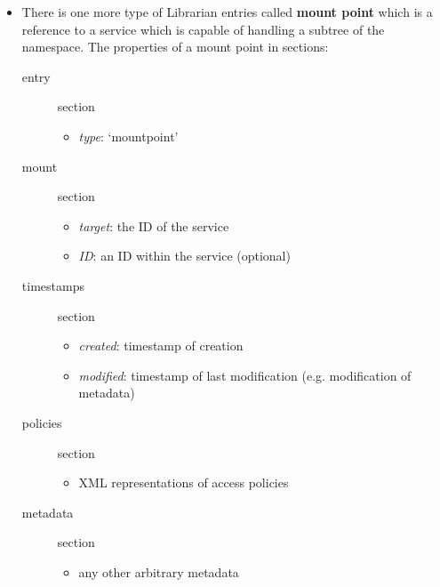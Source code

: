 \documentclass{book}
\begin{document}
\begin{itemize}
    \item There is one more type of Librarian entries called \textbf{mount point} which is a reference to a service which is capable of handling a subtree of the namespace. The properties of a mount point in sections:
    \begin{description}
        \item [entry] section 
        \begin{itemize}
            \item \emph{type}: `mountpoint' 
        \end{itemize}
        \item [mount] section 
        \begin{itemize}
            \item \emph{target}: the ID of the service
            \item \emph{ID}: an ID within the service (optional)
        \end{itemize}
        \item [timestamps] section 
        \begin{itemize}
            \item \emph{created}: timestamp of creation 
            \item \emph{modified}: timestamp of last modification (e.g. modification of metadata)
        \end{itemize}
        \item [policies] section 
        \begin{itemize}
            \item XML representations of access policies 
        \end{itemize}
        \item [metadata] section 
        \begin{itemize}
            \item any other arbitrary metadata 
        \end{itemize}
    \end{description}


\end{itemize}
\end{document}
